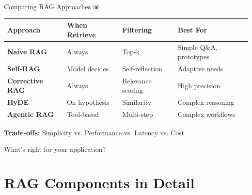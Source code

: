 \documentclass[aspectratio=169]{beamer}
\begin{document}
\begin{frame}{Comparing RAG Approaches 📊}
\begin{table}
\small
\begin{tabular}{l p{2.5cm} p{2.5cm} p{3cm}}
\toprule
\textbf{Approach} & \textbf{When Retrieve} & \textbf{Filtering} & \textbf{Best For} \\
\midrule
\textbf{Naive RAG} & Always & Top-k & Simple Q\&A, prototypes \\
\addlinespace
\textbf{Self-RAG} & Model decides & Self-reflection & Adaptive needs \\
\addlinespace
\textbf{Corrective RAG} & Always & Relevance scoring & High precision \\
\addlinespace
\textbf{HyDE} & On hypothesis & Similarity & Complex reasoning \\
\addlinespace
\textbf{Agentic RAG} & Tool-based & Multi-step & Complex workflows \\
\bottomrule
\end{tabular}
\end{table}

\vspace{0.5em}

\begin{thinkbox}
\textbf{Trade-offs:} Simplicity vs. Performance vs. Latency vs. Cost

What's right for your application?
\end{thinkbox}
\end{frame}

\section{RAG Components in Detail}
\end{document}

